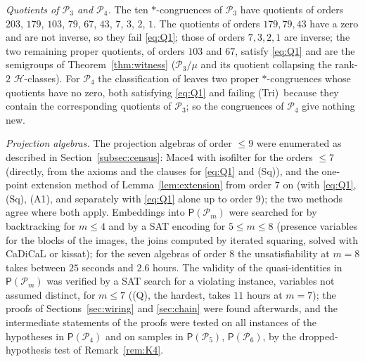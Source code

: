 \documentclass[11pt]{amsart}
\theoremstyle{definition}
\newcommand{\Hh}{\mathcal{H}}
\renewcommand{\P}{\mathcal{P}}      %
\newcommand{\PA}{\mathsf{P}}         %
\newcommand{\Tri}{\textup{(Tri)}}
\newcommand{\Wire}{\textup{(Sq)}}      %
\newcommand{\Rcond}{\textup{(A1)}}     %
\newcommand{\Qcond}{\textup{(Q)}}
\begin{document}
\emph{Quotients of $\P_3$ and $\P_4$.} The ten $*$-congruences of $\P_3$ have quotients of orders $203$, $179$, $103$, $79$, $67$, $43$, $7$, $3$, $2$, $1$. The quotients of orders $179,79,43$ have a zero and are not inverse, so they fail \eqref{eq:Q1}; those of orders $7,3,2,1$ are inverse; the two remaining proper quotients, of orders $103$ and $67$, satisfy \eqref{eq:Q1} and are the semigroups of Theorem~\ref{thm:witness} ($\P_3/\mu$ and its quotient collapsing the rank-$2$ $\Hh$-classes). For $\P_4$ the classification of \cite{EMRT} leaves two proper $*$-congruences whose quotients have no zero, both satisfying \eqref{eq:Q1} and failing \Tri\ because they contain the corresponding quotients of $\P_3$; so the congruences of $\P_4$ give nothing new.

\emph{Projection algebras.} The projection algebras of order $\le9$ were enumerated as described in Section~\ref{subsec:census}: Mace4 with isofilter for the orders $\le7$ (directly, from the axioms and the clauses for \eqref{eq:Q1} and \Wire), and the one-point extension method of Lemma~\ref{lem:extension} from order $7$ on (with \eqref{eq:Q1}, \Wire, \Rcond, and separately with \eqref{eq:Q1} alone up to order $9$); the two methods agree where both apply. Embeddings into $\PA(\P_m)$ were searched for by backtracking for $m\le4$ and by a SAT encoding for $5\le m\le8$ (presence variables for the blocks of the images, the joins computed by iterated squaring, solved with CaDiCaL or kissat); for the seven algebras of order $8$ the unsatisfiability at $m=8$ takes between $25$ seconds and $2.6$ hours. The validity of the quasi-identities in $\PA(\P_m)$ was verified by a SAT search for a violating instance, variables not assumed distinct, for $m\le7$ (\Qcond, the hardest, takes $11$ hours at $m=7$); the proofs of Sections~\ref{sec:wiring} and \ref{sec:chain} were found afterwards, and the intermediate statements of the proofs were tested on all instances of the hypotheses in $\PA(\P_4)$ and on samples in $\PA(\P_5)$, $\PA(\P_6)$, by the dropped-hypothesis test of Remark~\ref{rem:K4}.
\end{document}
